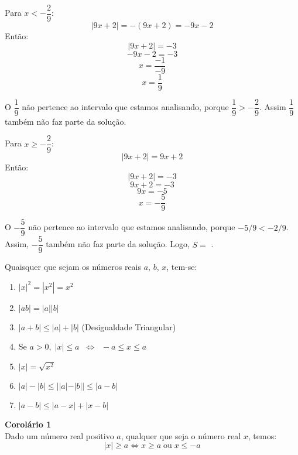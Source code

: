 \begin{description}
                Para $x < -\dfrac{2}{9}$:
                \[ |9x+2| = -(9x+2) = -9x-2\]
                Então:
                \[ |9x+2|= -3 \]
                \[-9x-2=-3 \]
                \[x=\dfrac{-1}{-9}\]
                \[x=\dfrac{1}{9}\] 
                
                O $\dfrac{1}{9}$ não pertence ao intervalo que estamos analisando, porque $\dfrac{1}{9} > -\dfrac{2}{9}$. Assim $\dfrac{1}{9}$ também não faz parte da solução.

                Para $x \ge -\dfrac{2}{9}$:
                \[ |9x+2| = 9x+2\]
                Então:
                \[ |9x+2|= -3 \]
                \[9x+2=-3 \]
                \[9x=-5 \]
                \[x=-\dfrac{5}{9}\]

                O $-\dfrac{5}{9}$ não pertence ao intervalo que estamos analisando, porque $-5/9 < -2/9$. Assim, $-\dfrac{5}{9}$ também não faz parte da solução. Logo, $S=$ \slashzero .
            \end{description}

    \begin{tcolorbox}[colback=white,colframe=minha_cor,coltitle=black,title=Proposições]
    Quaisquer que sejam os números reais $a$, $b$, $x$, tem-se:\\
    
      \begin{enumerate}
		\item ${|x|}^2 = |x^2| = x^2$\\[-0.25cm]
		\item $|ab|= |a| |b|$\\[-0.25cm]
		\item $|a+b| \le |a| + |b|$ (Desigualdade Triangular)\\[-0.25cm]
		\item Se $a > 0, \; |x| \le a \;\; \Leftrightarrow \;\; -a \le x \le a$\\[-0.25cm]
		\item $|x| = \sqrt{x^2}$\\[-0.25cm]
		\item  $|a| - |b| \le ||a| - |b|| \le |a-b| $\\[-0.25cm]
		\item $|a-b| \le |a-x| + |x-b|$\\[-0.25cm]
	 \end{enumerate}
    \end{tcolorbox} 

    \noindent
	\textbf{Corolário 1}\\
	Dado um número real positivo $a$, qualquer que seja o número real $x$, temos:
	\[
	|x| \ge a \Leftrightarrow x \ge a \; \text{ou} \; x \le -a
	\]

